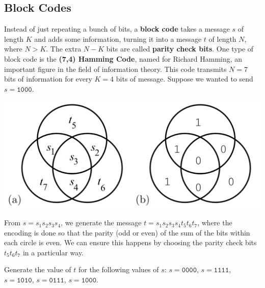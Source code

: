 \documentclass{article}
\begin{document}
\subsection{Block Codes}

Instead of just repeating a bunch of bits, a \textbf{block code} takes a message \(s\) of length \(K\) and adds some information, turning it into a message \(t\) of length \(N\), where \(N>K\).
The extra \(N-K\) bits are called \textbf{parity check bits}.
One type of block code is the \textbf{(7,4) Hamming Code}, named for Richard Hamming, an important figure in the field of information theory.
This code transmits \(N=7\) bits of information for every \(K=4\) bits of message.
Suppose we wanted to send \(s = \texttt{1000}\).
\begin{center}
    \includegraphics[scale=0.15]{Pics/hamming74.png}
\end{center}
From \(s = s_1s_2s_3s_4\), we generate the message \(t = s_1s_2s_3s_4t_5t_6t_7\), where the encoding is done so that the parity (odd or even) of the sum of the bits within each circle is even.
We can ensure this happens by choosing the parity check bits \(t_5t_6t_7\) in a particular way.

\begin{exercise}
    Generate the value of \(t\) for the following values of \(s\): \(s = \texttt{0000}\), \(s = \texttt{1111}\), \(s = \texttt{1010}\), \(s = \texttt{0111}\), \(s = \texttt{1000}\).
\end{exercise}
\end{document}
